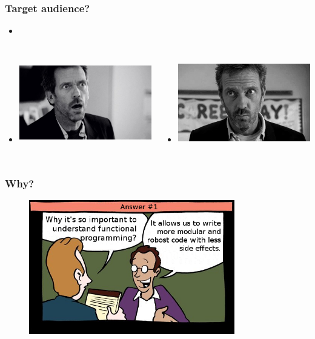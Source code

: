 \documentclass[18pt, compress]{beamer}
\begin{document}
\begin{frame}[fragile]
    \frametitle{Target audience?}
    \begin{itemize}[leftmargin=*]
        \item <+->
    \end{itemize}

    \vspace{-40pt}

    \begin{columns}[T,onlytextwidth]
    \begin{itemize}[leftmargin=*]
        \item <+->\includegraphics[width=6cm,height=3.5cm]{house1.jpeg}
    \end{itemize}

    \vspace{20pt}

    \begin{itemize}[leftmargin=*]
        \item <+->\includegraphics[width=6cm,height=3.5cm]{house2.png}
    \end{itemize}
    \end{columns}
\end{frame}

\begin{frame}
    \frametitle{Why?}
    \vspace{-25pt}
    \begin{figure}
        \includegraphics[width=0.8\textwidth,center]{first_option.png}
    \end{figure}
\end{frame}
\end{document}

